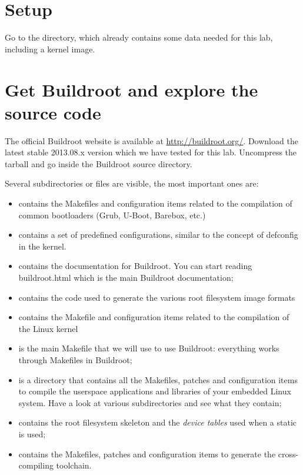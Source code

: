 
\section{Setup}

Go to the  directory,
which already contains some data needed for this lab, including a
kernel image.

\section{Get Buildroot and explore the source code}

The official Buildroot website is available at
\url{http://buildroot.org/}. Download the latest stable 2013.08.x
version which we have tested for this lab. Uncompress the tarball
and go inside the Buildroot source directory.

Several subdirectories or files are visible, the most important ones
are:

\begin{itemize}
\item {} contains the Makefiles and configuration items
  related to the compilation of common bootloaders (Grub, U-Boot,
  Barebox, etc.)
\item {} contains a set of predefined configurations,
  similar to the concept of defconfig in the kernel.
\item {} contains the documentation for Buildroot. You can
  start reading buildroot.html which is the main Buildroot
  documentation;
\item {} contains the code used to generate the various root
  filesystem image formats
\item {} contains the Makefile and configuration items
  related to the compilation of the Linux kernel
\item {} is the main Makefile that we will use to use
  Buildroot: everything works through Makefiles in Buildroot;
\item {} is a directory that contains all the Makefiles,
  patches and configuration items to compile the userspace
  applications and libraries of your embedded Linux system. Have a
  look at various subdirectories and see what they contain;
\item {} contains the root filesystem skeleton and the {\em
    device tables} used when a static  is used;
\item {} contains the Makefiles, patches and
  configuration items to generate the cross-compiling toolchain.
\end{itemize}

